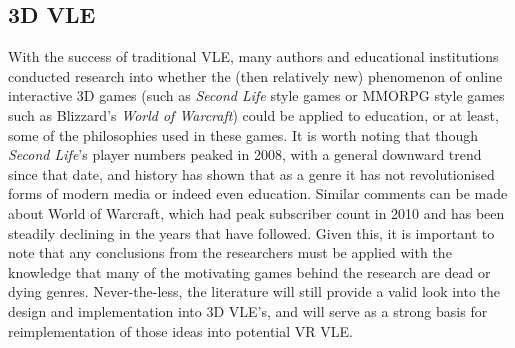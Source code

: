 \documentclass[11pt]{report}
\begin{document}
\subsection{3D VLE}
With the success of traditional VLE, many authors and educational institutions conducted research into whether the (then relatively new) phenomenon of online interactive 3D games (such as \textit{Second Life} style games or MMORPG style games such as Blizzard's \textit{World of Warcraft}) could be applied to education, or at least, some of the philosophies used in these games. It is worth noting that though \textit{Second Life}'s player numbers peaked in 2008\cite{Voyager2017}, with a general downward trend since that date, and history has shown that as a genre it has not revolutionised forms of modern media or indeed even education. Similar comments can be made about World of Warcraft, which had peak subscriber count in 2010\cite{Statista.com2017} and has been steadily declining in the years that have followed. Given this, it is important to note that any conclusions from the researchers must be applied with the knowledge that many of the motivating games behind the research are dead or dying genres. Never-the-less, the literature will still provide a valid look into the design and implementation into 3D VLE's, and will serve as a strong basis for reimplementation of those ideas into potential VR VLE.\\~\\
\end{document}
